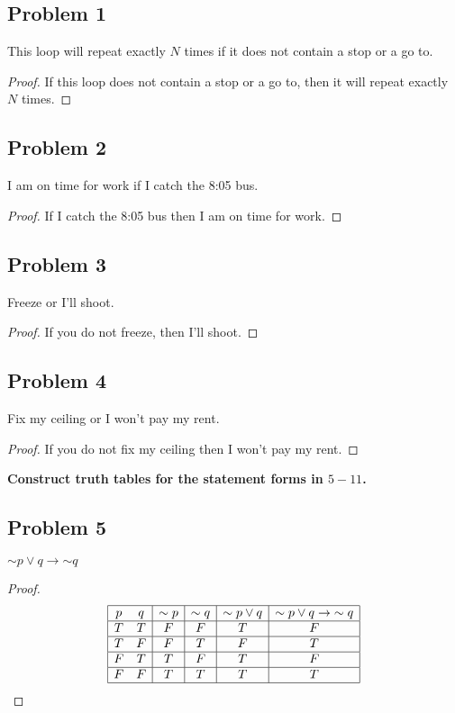 \documentclass[14pt]{extarticle}
\begin{document}
\subsection{Problem 1}
This loop will repeat exactly $N$ times if it does not contain a stop or a go to.

\begin{proof}
If this loop does not contain a stop or a go to, then it will repeat exactly $N$ times.
\end{proof}

\subsection{Problem 2}
I am on time for work if I catch the 8:05 bus.

\begin{proof}
If I catch the 8:05 bus then I am on time for work.
\end{proof}

\subsection{Problem 3}
Freeze or I’ll shoot.

\begin{proof}
If you do not freeze, then I’ll shoot.
\end{proof}

\subsection{Problem 4}
Fix my ceiling or I won’t pay my rent.

\begin{proof}
If you do not fix my ceiling then I won't pay my rent.
\end{proof}

{\bf Construct truth tables for the statement forms in $5-11$.}

\subsection{Problem 5}
${\sim p} \vee q \to {\sim q}$

\begin{proof}
$$
\begin{array}{|cc|c|c|c|c|}
\hline
p & q & {\sim p} & {\sim q} & {\sim p} \vee q & {\sim p} \vee q \to {\sim q} \\
\hline
T & T & F & F & T & F \\
\hline
T & F & F & T & F & T \\
\hline
F & T & T & F & T & F \\
\hline
F & F & T & T & T & T \\
\hline
\end{array}
$$
\end{proof}
\end{document}

